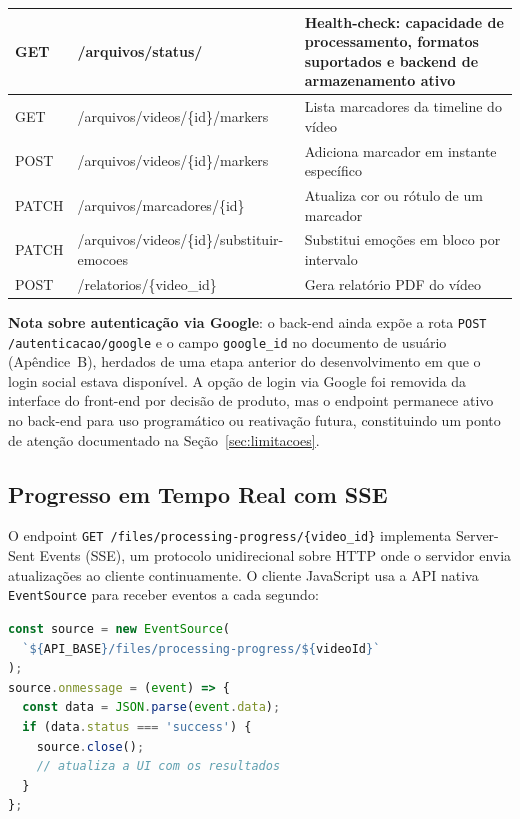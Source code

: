 \documentclass[
	12pt,
	openright,
	oneside,
	a4paper,
	english,
	brazil
	]{abntex2}
\begin{document}
\begin{table}[H]
{\begin{tabular}{|l|l|l|}
GET             & /arquivos/status/                                            & Health-check: capacidade de processamento, formatos suportados e backend de armazenamento ativo \\ \hline
GET             & /arquivos/videos/\{id\}/markers                              & Lista marcadores da timeline do vídeo         \\ \hline
POST            & /arquivos/videos/\{id\}/markers                              & Adiciona marcador em instante específico       \\ \hline
PATCH           & /arquivos/marcadores/\{id\}                                     & Atualiza cor ou rótulo de um marcador         \\ \hline
PATCH           & /arquivos/videos/\{id\}/substituir-emocoes                & Substitui emoções em bloco por intervalo      \\ \hline
POST            & /relatorios/\{video\_id\}                                 & Gera relatório PDF do vídeo                   \\ \hline
\end{tabular}%
}
\end{table}

\textbf{Nota sobre autenticação via Google}: o back-end ainda expõe a rota \texttt{POST /autenticacao/google} e o campo \texttt{google\_id} no documento de usuário (Apêndice~B), herdados de uma etapa anterior do desenvolvimento em que o login social estava disponível. A opção de login via Google foi removida da interface do front-end por decisão de produto, mas o endpoint permanece ativo no back-end para uso programático ou reativação futura, constituindo um ponto de atenção documentado na Seção~\ref{sec:limitacoes}.

\subsection{Progresso em Tempo Real com SSE}

O endpoint \texttt{GET /files/processing-progress/\{video\_id\}} implementa Server-Sent Events (SSE), um protocolo unidirecional sobre HTTP onde o servidor envia atualizações ao cliente continuamente. O cliente JavaScript usa a API nativa \texttt{EventSource} para receber eventos a cada segundo:

\begin{lstlisting}[language=JavaScript, caption={Exemplo de uso do SSE no front-end}]
const source = new EventSource(
  `${API_BASE}/files/processing-progress/${videoId}`
);
source.onmessage = (event) => {
  const data = JSON.parse(event.data);
  if (data.status === 'success') {
    source.close();
    // atualiza a UI com os resultados
  }
};
\end{lstlisting}
\end{document}
